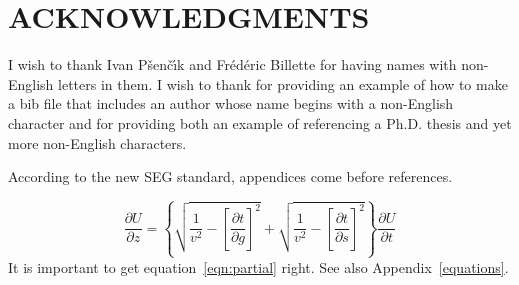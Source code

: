 \documentclass[paper,twocolumn,twoside]{geophysics}
\begin{document}

\section{ACKNOWLEDGMENTS}

I wish to thank Ivan P\v{s}en\v{c}\'{\i}k and Fr\'ed\'eric Billette for having
names with non-English letters in them.  I wish to thank \cite{Cerveny} for
providing an example of how to make a bib file that includes an author
whose name begins with a non-English character and \cite{forgues96} for
providing both an example of referencing a Ph.D. thesis and yet more
non-English characters.


According to the new SEG standard, appendices come before references.

\begin{equation}
\frac{\partial U}{\partial z} = 
\left\{
  \sqrt{\frac{1}{v^2} - \left[\frac{\partial t}{\partial g}\right]^2} +
  \sqrt{\frac{1}{v^2} - \left[\frac{\partial t}{\partial s}\right]^2}
\right\}
\frac{\partial U}{\partial t}
\label{eqn:partial}
\end{equation}
It is important to get equation~\ref{eqn:partial} right. See also
Appendix~\ref{equations}.
\end{document}
